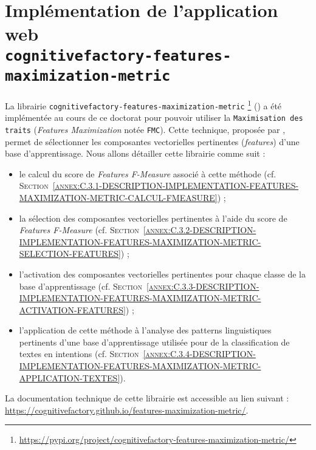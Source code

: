 \section[
		\texttt{cognitivefactory-features-maximization-metric}
	]{
		Implémentation de l'application web \\ \texttt{cognitivefactory-features-maximization-metric}
	}
\label{annex:C.3-DESCRIPTION-IMPLEMENTATION-FEATURES-MAXIMIZATION-METRIC}
	
	La librairie \texttt{cognitivefactory-features-maximization-metric} \footnote{
		\url{https://pypi.org/project/cognitivefactory-features-maximization-metric/}
	} (\cite{schild:2023:cognitivefactory-featuresmaximizationmetric}) a été implémentée au cours de ce doctorat pour pouvoir utiliser la \texttt{Maximisation des traits} (\textit{Features Maximization} notée \texttt{FMC}).
	Cette technique, proposée par \cite{lamirel-etal:2017:novel-approach-feature}, permet de sélectionner les composantes vectorielles pertinentes (\textit{features}) d'une base d'apprentissage.
	Nous allons détailler cette librairie comme suit :
	\begin{itemize}
		\item le calcul du score de \textit{Features F-Measure} associé à cette méthode (cf. \textsc{Section~\ref{annex:C.3.1-DESCRIPTION-IMPLEMENTATION-FEATURES-MAXIMIZATION-METRIC-CALCUL-FMEASURE}}) ;
		\item la sélection des composantes vectorielles pertinentes à l'aide du score de \textit{Features F-Measure} (cf. \textsc{Section~\ref{annex:C.3.2-DESCRIPTION-IMPLEMENTATION-FEATURES-MAXIMIZATION-METRIC-SELECTION-FEATURES}}) ;
		\item l'activation des composantes vectorielles pertinentes pour chaque classe de la base d'apprentissage (cf. \textsc{Section~\ref{annex:C.3.3-DESCRIPTION-IMPLEMENTATION-FEATURES-MAXIMIZATION-METRIC-ACTIVATION-FEATURES}}) ;
		\item l'application de cette méthode à l'analyse des patterns linguistiques pertinents d'une base d'apprentissage utilisée pour de la classification de textes en intentions (cf. \textsc{Section~\ref{annex:C.3.4-DESCRIPTION-IMPLEMENTATION-FEATURES-MAXIMIZATION-METRIC-APPLICATION-TEXTES}}).
	\end{itemize}
	
	\begin{leftBarInformation}
		La documentation technique de cette librairie est accessible au lien suivant : \url{https://cognitivefactory.github.io/features-maximization-metric/}.
	\end{leftBarInformation}
	
